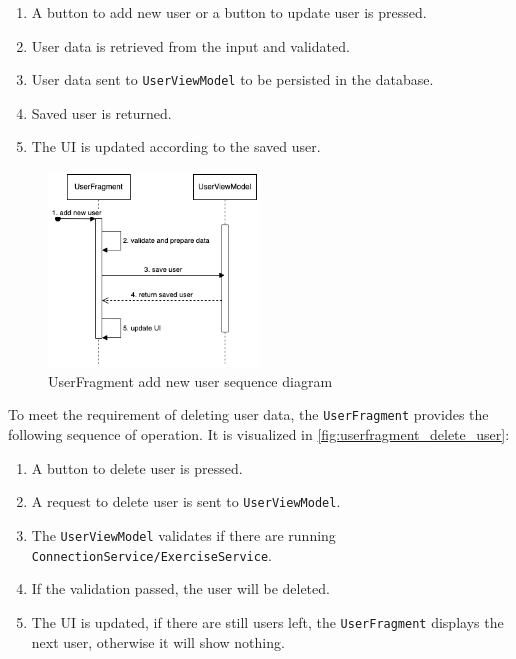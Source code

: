 \begin{enumerate}
    \item A button to add new user or a button to update user is pressed.
    \item User data is retrieved from the input and validated.
    \item User data sent to \texttt{UserViewModel} to be persisted in the database.
    \item Saved user is returned.
    \item The UI is updated according to the saved user.
\end{enumerate}

\begin{figure}[H]
    \centering
    \includegraphics[width=0.5\textwidth]{diagrams/create-user-seq.drawio.png}
    \caption{UserFragment add new user sequence diagram}
    \label{fig:userfragment_add_new_user}
\end{figure}

To meet the requirement of deleting user data, the \texttt{UserFragment} provides the following sequence of operation. It is visualized in \autoref{fig:userfragment_delete_user}:

\begin{enumerate}
    \item A button to delete user is pressed.
    \item A request to delete user is sent to \texttt{UserViewModel}.
    \item The \texttt{UserViewModel} validates if there are running \texttt{ConnectionService/ExerciseService}.
    \item If the validation passed, the user will be deleted.
    \item The UI is updated, if there are still users left, the \texttt{UserFragment} displays the next user, otherwise it will show nothing.
\end{enumerate}


